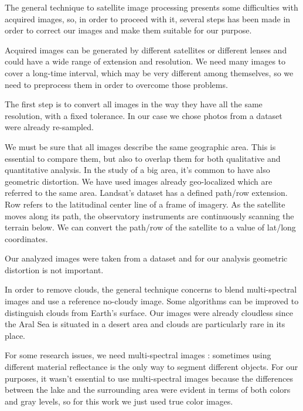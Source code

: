 The general technique to satellite image processing presents some difficulties with acquired images, so, in order to proceed with it, several steps has been made in order to correct our images and make them suitable for our purpose.

Acquired images can be generated by different satellites or different lenses and could have a wide range of extension and resolution. 
We need many images to cover a long-time interval, which may be very different among themselves, so we need to preprocess them in order to overcome those problems.

The first step is to convert all images in the way they have all the same resolution, with a fixed tolerance. 
In our case we chose photos from a dataset were already re-sampled.

We must be sure that all images describe the same geographic area. This is essential to compare them, but also to overlap them for both qualitative and quantitative analysis. 
In the study of a big area, it's common to have also geometric distortion.
We have used images already geo-localized which are referred to the same area. 
Landsat's dataset has a defined path/row extension.
Row refers to the latitudinal center line of a frame of imagery. As the satellite moves along its path, the observatory instruments are continuously scanning the terrain below. 
We can convert the path/row of the satellite to a value of lat/long coordinates.

Our analyzed images were taken from a dataset and for our analysis geometric distortion is not important. 

In order to remove clouds, the general technique concerns to blend multi-spectral images and use a reference no-cloudy image. 
Some algorithms can be improved to distinguish clouds from Earth's surface. Our images were already cloudless since the Aral Sea is situated in a desert area and clouds are particularly rare in its place.

For some research issues, we need multi-spectral images \cite{satelliteImg}: sometimes using different material reflectance is the only way to segment different objects.
For our purposes, it wasn't essential to use multi-spectral images because the differences between the lake and the surrounding area were evident in terms of both colors and gray levels, so for this work we just used true color images.

